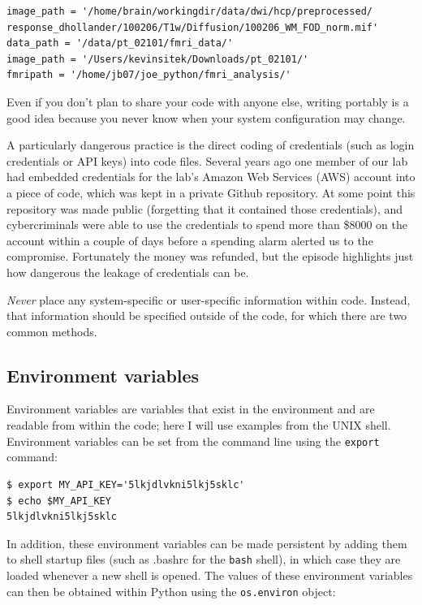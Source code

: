 \begin{lstlisting}[style=Python]
image_path = '/home/brain/workingdir/data/dwi/hcp/preprocessed/ response_dhollander/100206/T1w/Diffusion/100206_WM_FOD_norm.mif'
data_path = '/data/pt_02101/fmri_data/'
image_path = '/Users/kevinsitek/Downloads/pt_02101/'
fmripath = '/home/jb07/joe_python/fmri_analysis/'
\end{lstlisting}

Even if you don't plan to share your code with anyone else, writing portably is a good idea because you never know when your system configuration may change.

A particularly dangerous practice is the direct coding of credentials (such as login credentials or API keys) into code files.
Several years ago one member of our lab had embedded credentials for the lab's Amazon Web Services (AWS) account into a piece of code, which was kept in a private Github repository.
At some point this repository was made public (forgetting that it contained those credentials), and cybercriminals were able to use the credentials to spend more than \$8000 on the account within a couple of days before a spending alarm alerted us to the compromise.
Fortunately the money was refunded, but the episode highlights just how dangerous the leakage of credentials can be.

\textit{Never} place any system-specific or user-specific information within code.
Instead, that information should be specified outside of the code, for which there are two common methods.

\subsection{Environment variables}

Environment variables are variables that exist in the environment and are readable from within the code; here I will use examples from the UNIX shell.
Environment variables can be set from the command line using the \texttt{export} command:

\begin{lstlisting}[style=shellshort]
$ export MY_API_KEY='5lkjdlvkni5lkj5sklc'
$ echo $MY_API_KEY
5lkjdlvkni5lkj5sklc
\end{lstlisting}

In addition, these environment variables can be made persistent by adding them to shell startup files (such as .bashrc for the \texttt{bash} shell), in which case they are loaded whenever a new shell is opened.
The values of these environment variables can then be obtained within Python using the \texttt{os.environ} object:

